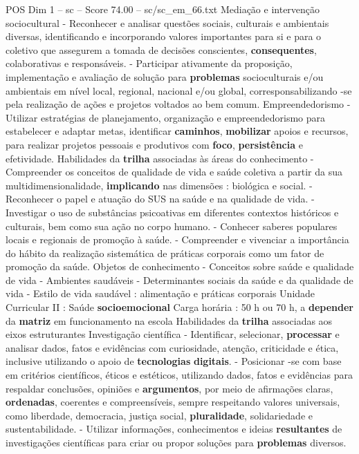 \begin{textsample}{POS Dim 1 – sc – Score 74.00 – sc/sc\_em\_66.txt}
Mediação e intervenção sociocultural - Reconhecer e analisar questões sociais, culturais e ambientais diversas, identificando e incorporando valores importantes para si e para o coletivo que assegurem a tomada de decisões conscientes, \textbf{consequentes}, colaborativas e responsáveis. - Participar ativamente da proposição, implementação e avaliação de solução para \textbf{problemas} socioculturais e/ou ambientais em nível local, regional, nacional e/ou global, corresponsabilizando -se pela realização de ações e projetos voltados ao bem comum.
Empreendedorismo - Utilizar estratégias de planejamento, organização e empreendedorismo para estabelecer e adaptar metas, identificar \textbf{caminhos}, \textbf{mobilizar} apoios e recursos, para realizar projetos pessoais e produtivos com \textbf{foco}, \textbf{persistência} e efetividade.
Habilidades da \textbf{trilha} associadas às áreas do conhecimento - Compreender os conceitos de qualidade de vida e saúde coletiva a partir da sua multidimensionalidade, \textbf{implicando} nas dimensões : biológica e social. - Reconhecer o papel e atuação do SUS na saúde e na qualidade de vida. - Investigar o uso de substâncias psicoativas em diferentes contextos históricos e culturais, bem como sua ação no corpo humano. - Conhecer saberes populares locais e regionais de promoção à saúde. - Compreender e vivenciar a importância do hábito da realização sistemática de práticas corporais como um fator de promoção da saúde.
Objetos de conhecimento - Conceitos sobre saúde e qualidade de vida - Ambientes saudáveis - Determinantes sociais da saúde e da qualidade de vida - Estilo de vida saudável : alimentação e práticas corporais Unidade Curricular II : Saúde \textbf{socioemocional} Carga horária : 50 h ou 70 h, a \textbf{depender} da \textbf{matriz} em funcionamento na escola Habilidades da \textbf{trilha} associadas aos eixos estruturantes Investigação científica - Identificar, selecionar, \textbf{processar} e analisar dados, fatos e evidências com curiosidade, atenção, criticidade e ética, inclusive utilizando o apoio de \textbf{tecnologias} \textbf{digitais}. - Posicionar -se com base em critérios científicos, éticos e estéticos, utilizando dados, fatos e evidências para respaldar conclusões, opiniões e \textbf{argumentos}, por meio de afirmações claras, \textbf{ordenadas}, coerentes e compreensíveis, sempre respeitando valores universais, como liberdade, democracia, justiça social, \textbf{pluralidade}, solidariedade e sustentabilidade. - Utilizar informações, conhecimentos e ideias \textbf{resultantes} de investigações científicas para criar ou propor soluções para \textbf{problemas} diversos.

\end{textsample}

